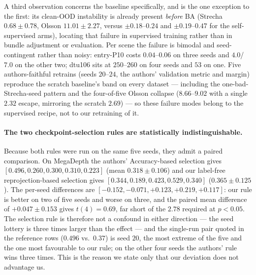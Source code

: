 \documentclass{article}
\begin{document}
A third observation concerns the baseline specifically, and is the one exception to the
first: its clean-OOD instability is already present \emph{before} BA (Strecha
$0.68\pm0.78$, Olsson $11.01\pm2.27$, versus $\pm0.18$--$0.24$ and $\pm0.19$--$0.47$ for
the self-supervised arms), locating that failure in supervised training rather than in
bundle adjustment or evaluation. Per scene the failure is bimodal and seed-contingent
rather than noisy: entry-P10 costs $0.04$--$0.06$ on three seeds and $4.0$/$7.0$ on the
other two; dtu106 sits at $250$--$260$ on four seeds and $53$ on one. Five
authors-faithful retrains (seeds $20$--$24$, the authors' validation metric and margin)
reproduce the scratch baseline's band on every dataset --- including the
one-bad-Strecha-seed pattern and the four-of-five Olsson collapse ($8.66$--$9.02$ with a
single $2.32$ escape, mirroring the scratch $2.69$) --- so these failure modes belong to
the supervised recipe, not to our retraining of it.

\paragraph{The two checkpoint-selection rules are statistically indistinguishable.}
Because both rules were run on the same five seeds, they admit a paired comparison.
On MegaDepth the authors' Accuracy-based selection gives
$[0.496, 0.260, 0.300, 0.310, 0.223]$ (mean $0.318\pm0.106$) and our label-free
reprojection-based selection gives $[0.344, 0.189, 0.423, 0.529, 0.340]$
($0.365\pm0.125$). The per-seed differences are
$[-0.152, -0.071, +0.123, +0.219, +0.117]$: our rule is better on two of five seeds and
worse on three, and the paired mean difference of $+0.047\pm0.153$ gives
$t(4)=0.69$, far short of the $2.78$ required at $p<0.05$. The selection rule is
therefore not a confound in either direction --- the seed lottery is three times larger
than the effect --- and the single-run pair quoted in the reference rows
($0.496$ vs.\ $0.37$) is seed $20$, the most extreme of the five and the one most
favourable to our rule; on the other four seeds the authors' rule wins three times.
This is the reason we state only that our deviation does not advantage us.
\end{document}
